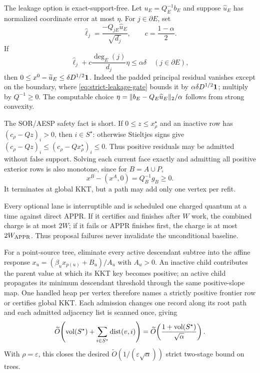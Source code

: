 The leakage option is exact-support-free.  Let $u_E=Q_E^{-1}b_E$ and suppose
$\widehat u_E$ has normalized coordinate error at most $\eta$.  For
$j\in\partial E$, set
\begin{equation*}
 \widehat\ell_j=\frac{-Q_{jE}\widehat u_E}{\sqrt{d_j}},
 \qquad c=\frac{1-\alpha}{2}.
\end{equation*}
If
\begin{equation}
 \widehat\ell_j+c\frac{\deg_E(j)}{d_j}\eta\leq\alpha\delta
 \quad(j\in\partial E),
 \label{eq:strict-leakage-gate}
\end{equation}
then $0\leq x^0-\widetilde u_E\leq\delta D^{1/2}\mathbf{1}$.  Indeed the padded
principal residual vanishes except on the boundary, where
\cref{eq:strict-leakage-gate} bounds it by
$\alpha\delta D^{1/2}\mathbf{1}$; multiply by $Q^{-1}\geq0$.  The computable choice
$\eta=\lVert b_E-Q_E\widehat u_E\rVert_2/\alpha$ follows from strong convexity.

The SOR/AESP safety fact is short.  If $0\leq z\leq x_\rho^\star$ and an
inactive row has $(c_\rho-Qz)_i>0$, then $i\in S^\star$: otherwise Stieltjes
signs give $(c_\rho-Qz)_i\leq(c_\rho-Qx_\rho^\star)_i\leq0$.  Thus positive
residuals may be admitted without false support.  Solving each current face
exactly and admitting all positive exterior rows is also monotone, since for
$B=A\cup P$,
\begin{equation*}
 x^B-(x^A,0)=Q_B^{-1}g_B\geq0.
\end{equation*}
It terminates at global KKT, but a path may add only one vertex per refit.

Every optional lane is interruptible and is scheduled one charged quantum at
a time against direct APPR.  If it certifies and finishes after $W$ work, the
combined charge is at most $2W$; if it fails or APPR finishes first, the charge
is at most $2W_{\rm APPR}$.  Thus proposal failures never invalidate the
unconditional baseline.

For a point-source tree, eliminate every active descendant subtree into the
affine response
$x_u=(\beta_ux_{p(u)}+B_u)/A_u$ with $A_u>0$.  An inactive child contributes
the parent value at which its KKT key becomes positive; an active child
propagates its minimum descendant threshold through the same positive-slope
map.  One handled heap per vertex therefore names a strictly positive
frontier row or certifies global KKT.  Each admission changes one record along
its root path and each admitted adjacency list is scanned once, giving
\begin{equation}
 \widetilde O\!\left(
   \operatorname{vol}(S^\star)+\sum_{i\in S^\star}\operatorname{dist}(v,i)
 \right)
 =\widetilde O\!\left(
   \frac{1+\operatorname{vol}(S^\star)}{\sqrt\alpha}
 \right).
 \label{eq:strict-tree-work}
\end{equation}
With $\rho=\varepsilon$, this closes the desired
$\widetilde O(1/(\varepsilon\sqrt\alpha))$ strict two-stage bound on trees.

